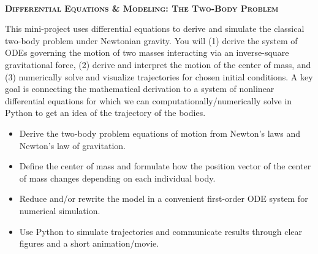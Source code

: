 \documentclass[article, 11pt]{article}
\begin{document}
\begin{center}
\\
\Huge{\textbf{\textsc{Differential Equations \& Modeling: The Two-Body Problem}}}\\
\end{center}

\vspace{.6cm}

\noindent {}

\vspace{-.35cm}
\noindent \hrulefill

This mini-project uses differential equations to derive and simulate the classical two-body problem under Newtonian gravity. You will (1) derive the system of ODEs governing the motion of two masses interacting via an inverse-square gravitational force, (2) derive and interpret the motion of the center of mass, and (3) numerically solve and visualize trajectories for chosen initial conditions. A key goal is connecting the mathematical derivation to a system of nonlinear differential equations for which we can computationally/numerically solve in Python to get an idea of the trajectory of the bodies.  

\vspace{.35cm}

\noindent {}

\vspace{-.35cm}
\noindent \hrulefill

\begin{itemize}
\item Derive the two-body problem equations of motion from Newton's laws and Newton's law of gravitation.
\item Define the center of mass and formulate how the position vector of the center of mass changes depending on each individual body.
\item Reduce and/or rewrite the model in a convenient first-order ODE system for numerical simulation.
\item Use Python to simulate trajectories and communicate results through clear figures and a short animation/movie.
\end{itemize}

\vspace{.35cm}

\noindent {}
\end{document}
